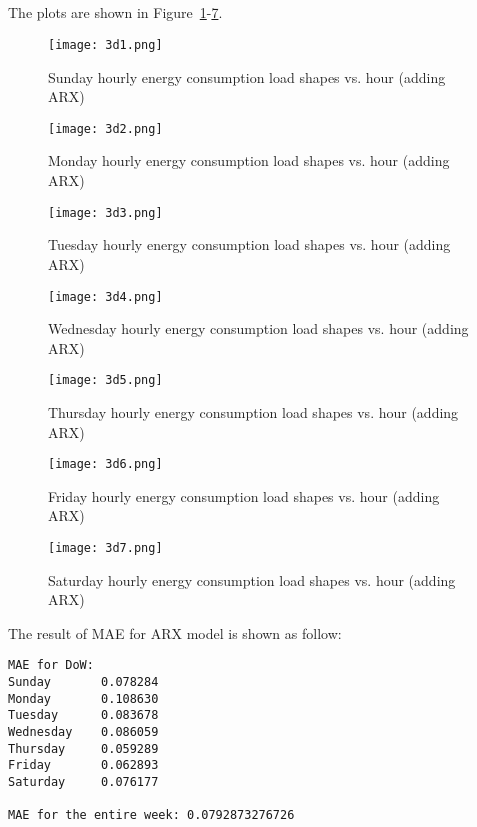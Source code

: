 \documentclass[12pt]{article}
\begin{document}
\subsection{}
The plots are shown in Figure~\ref{fig:3d1}-\ref{fig:3d7}.
\begin{figure}[H]
	\centering
	\texttt{[image: 3d1.png]}
	\vspace{-1cm}      
	\caption{Sunday hourly energy consumption load shapes vs. hour (adding ARX)}
	\label{fig:3d1}
\end{figure}
\begin{figure}[H]
	\centering
	\texttt{[image: 3d2.png]}
	\vspace{-1cm}      
	\caption{Monday hourly energy consumption load shapes vs. hour (adding ARX)}
	\label{fig:3d2}
\end{figure}
\begin{figure}[H]
	\centering
	\texttt{[image: 3d3.png]}
	\vspace{-1cm}      
	\caption{Tuesday hourly energy consumption load shapes vs. hour (adding ARX)}
	\label{fig:3d3}
\end{figure}
\begin{figure}[H]
	\centering
	\texttt{[image: 3d4.png]}
	\vspace{-1cm}      
	\caption{Wednesday hourly energy consumption load shapes vs. hour (adding ARX)}
	\label{fig:3d4}
\end{figure}
\begin{figure}[H]
	\centering
	\texttt{[image: 3d5.png]}
	\vspace{-1cm}      
	\caption{Thursday hourly energy consumption load shapes vs. hour (adding ARX)}
	\label{fig:3d5}
\end{figure}
\begin{figure}[H]
	\centering
	\texttt{[image: 3d6.png]}
	\vspace{-1cm}      
	\caption{Friday hourly energy consumption load shapes vs. hour (adding ARX)}
	\label{fig:3d6}
\end{figure}
\begin{figure}[H]
	\centering
	\texttt{[image: 3d7.png]}
	\vspace{-1cm}      
	\caption{Saturday hourly energy consumption load shapes vs. hour (adding ARX)}
	\label{fig:3d7}
\end{figure}
\newpage
\noindent The result of MAE for ARX model is shown as follow:
\begin{verbatim}
MAE for DoW:
Sunday       0.078284
Monday       0.108630
Tuesday      0.083678
Wednesday    0.086059
Thursday     0.059289
Friday       0.062893
Saturday     0.076177

MAE for the entire week: 0.0792873276726
\end{verbatim}
\newpage
\end{document}
